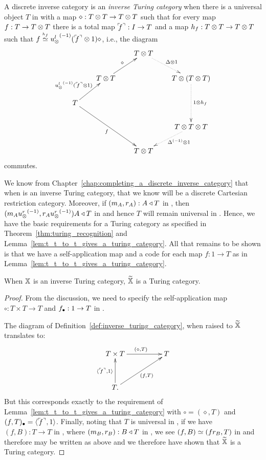 \begin{definition}\label{def:inverse_turing_category}
  A discrete inverse category \X is an \emph{inverse Turing category} when there is a universal object $T$ in
  \X with a map $\diamond :T\otimes T \to T\otimes T$ such that for every map $f:T \to T\otimes T$ there is a total map
  ${}^\ulcorner\!\!f^\urcorner: I\to T$ and a map $h_f:T\otimes T \to T\otimes T$ such that $f \overset{\scriptscriptstyle h_f}{\simeq}
  {u_{\otimes}^l}^{(-1)}({}^\ulcorner\!\!f^\urcorner\otimes1)\diamond$, i.e., the diagram
  \[
    \xymatrix @C=20pt @R=20pt{
      & & T \* T \ar@{.>}[dr]^{\Delta\* 1}\\
      &T\*T \ar[ur]^{\diamond} & & T \* (T\* T) \ar@{.>}[dd]^{1\*h_f}\\
      T \ar[ur]^{\inv{\usl}(\iname{f}\*1)} \ar[ddrr]_{f} \\
      & & & T \* T\*T \ar@{.>}[dl]^(.4){\inv{\Delta}\* 1}\\
      && T\*T
    }
  \]
  commutes.
\end{definition}

We know from Chapter~\ref{chap:completing_a_discrete_inverse_category} that when \X is an inverse
Turing category, that we know \Xt will be a discrete Cartesian restriction category. Moreover, if
$(m_A,r_A):A\triangleleft T$ in \X, then $(m_A{u_{\otimes}^r}^{(-1)},r_A{u_{\otimes}^r}^{(-1)})A \triangleleft T$ in \Xt and hence $T$
will remain universal in \Xt. Hence, we have the basic requirements for a Turing category as
specified in Theorem~\ref{thm:turing_recognition} and
Lemma~\ref{lem:t_t_to_t_gives_a_turing_category}. All that remains to be shown is that we have a
self-application map and a code for each map $f:1\to T$ as in Lemma~\ref{lem:t_t_to_t_gives_a_turing_category}.
\begin{theorem}\label{thm:inverse_turing_category_gives_a_turing_category}
  When $\mathbb{X}$ is an inverse Turing category, $\widetilde{\mathbb{X}}$ is a Turing category.
\end{theorem}
\begin{proof}
  From the discussion, we need to specify the self-application map $\circ:T\times T \to T$ and
  $f_{\bullet}:1 \to T$ in \Xt.

  The diagram of Definition~\ref{def:inverse_turing_category}, when raised to $\widetilde{\mathbb{X}}$
  translates to:
  \[
    \xymatrix@C+25pt@R+10pt{
      T \times T \ar[r]^{(\diamond, T)} &T \\
      T. \ar[u]^{\<\iname{f},1\>} \ar[ur]_{(f, T)}
    }
  \]
  But this corresponds exactly to the requirement of
  Lemma~\ref{lem:t_t_to_t_gives_a_turing_category} with $\circ = (\diamond,T)$ and $(f,T)_{\bullet} =
  \langle{}^\ulcorner\!\!f^\urcorner,1\rangle$.  Finally, noting that $T$ is universal in \X, if we have $(f,B):T\to T$ in \Xt,
  where $(m_B,r_B):B\triangleleft T$ in \X, we see $(f,B) \overset{\scriptscriptstyle }{\simeq} (fr_B,T)$ in \X and therefore may be
  written as above and we therefore have shown that $\widetilde{\mathbb{X}}$ is a Turing category.
\end{proof}


